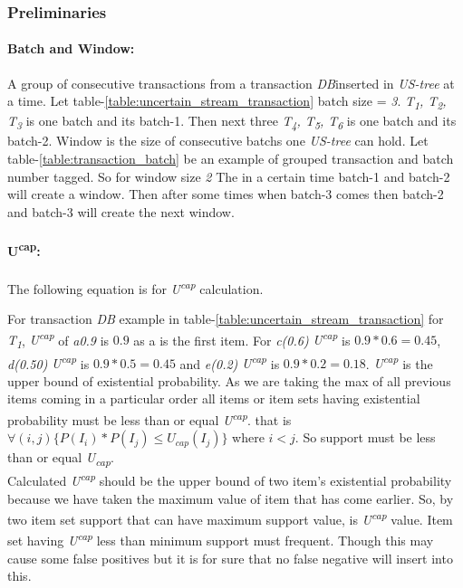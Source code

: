 \documentclass[conference]{IEEEtran}
\begin{document}
\subsubsection{Preliminaries}
    \paragraph{Batch and Window: }
    A group of consecutive transactions from a transaction \emph{DB}inserted in \emph{US-tree} at a time. Let table-\ref{table:uncertain_stream_transaction} batch size = \emph{3}. \emph{T\textsubscript{1}, T\textsubscript{2}, T\textsubscript{3}} is one batch and its batch-1. Then next three \emph{T\textsubscript{4}, T\textsubscript{5}, T\textsubscript{6}} is one batch and its batch-2. Window is the size of consecutive batchs one \emph{US-tree} can hold. Let table-\ref{table:transaction_batch} be an example of grouped transaction and batch number tagged. So for window size \emph{2} The in a certain time batch-1 and batch-2 will create a window. Then after some times when batch-3 comes then batch-2 and batch-3 will create the next window.
    
    \paragraph{U\textsuperscript{cap}: }
    The following equation is for \emph{U\textsuperscript{cap}} calculation.
    
    For transaction \emph{DB} example in table-\ref{table:uncertain_stream_transaction} for \emph{T\textsubscript{1}}, \emph{U\textsuperscript{cap}} of \emph{a{0.9}} is $0.9$ as a is the first item. For \emph{c(0.6)} \emph{U\textsuperscript{cap}} is $0.9*0.6=0.45$, \emph{d(0.50)} \emph{U\textsuperscript{cap}} is $0.9*0.5=0.45$ and \emph{e(0.2)} \emph{U\textsuperscript{cap}} is $0.9*0.2=0.18$. \emph{U\textsuperscript{cap}} is the upper bound of existential probability. As we are taking the max of all previous items coming in a particular order all items or item sets having existential probability must be less than or equal \emph{U\textsuperscript{cap}}. that is $\forall(i,j)\{ P(I_i)*P(I_j)\leq U_{cap}(I_j)\}$ where $i < j$. So support must be less than or equal \emph{U\textsubscript{cap}}.\\
    Calculated \emph{U\textsuperscript{cap}} should be the upper bound of two item's existential probability because we have taken the maximum value of item that has come earlier. So, by two item set support that can have maximum support value, is \emph{U\textsuperscript{cap}} value. Item set having \emph{U\textsuperscript{cap}} less than minimum support must frequent. Though this may cause some false positives but it is for sure that no false negative will insert into this. 
  
      
\end{document}
